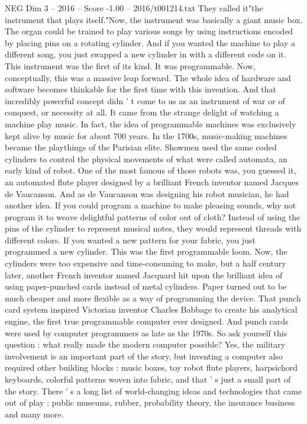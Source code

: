 \begin{textsample}{NEG Dim 3 – 2016 – Score -1.00 – 2016/t001214.txt}
They called it"the instrument that plays itself."Now, the instrument was basically a giant music box.
The organ could be trained to play various songs by using instructions encoded by placing pins on a rotating cylinder.
And if you wanted the machine to play a different song, you just swapped a new cylinder in with a different code on it.
This instrument was the first of its kind.
It was programmable.
Now, conceptually, this was a massive leap forward.
The whole idea of hardware and software becomes thinkable for the first time with this invention.
And that incredibly powerful concept didn ' t come to us as an instrument of war or of conquest, or necessity at all.
It came from the strange delight of watching a machine play music.
In fact, the idea of programmable machines was exclusively kept alive by music for about 700 years.
In the 1700s, music-making machines became the playthings of the Parisian elite.
Showmen used the same coded cylinders to control the physical movements of what were called automata, an early kind of robot.
One of the most famous of those robots was, you guessed it, an automated flute player designed by a brilliant French inventor named Jacques de Vaucanson.
And as de Vaucanson was designing his robot musician, he had another idea.
If you could program a machine to make pleasing sounds, why not program it to weave delightful patterns of color out of cloth?
Instead of using the pins of the cylinder to represent musical notes, they would represent threads with different colors.
If you wanted a new pattern for your fabric, you just programmed a new cylinder.
This was the first programmable loom.
Now, the cylinders were too expensive and time-consuming to make, but a half century later, another French inventor named Jacquard hit upon the brilliant idea of using paper-punched cards instead of metal cylinders.
Paper turned out to be much cheaper and more flexible as a way of programming the device.
That punch card system inspired Victorian inventor Charles Babbage to create his analytical engine, the first true programmable computer ever designed.
And punch cards were used by computer programmers as late as the 1970s.
So ask yourself this question : what really made the modern computer possible?
Yes, the military involvement is an important part of the story, but inventing a computer also required other building blocks : music boxes, toy robot flute players, harpsichord keyboards, colorful patterns woven into fabric, and that ' s just a small part of the story.
There ' s a long list of world-changing ideas and technologies that came out of play : public museums, rubber, probability theory, the insurance business and many more.

\end{textsample}
